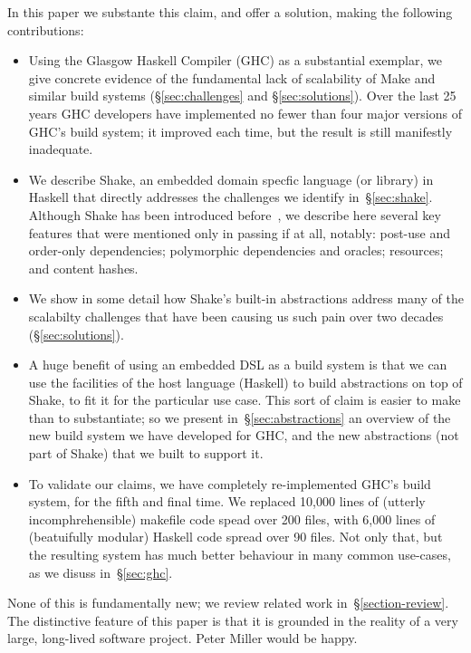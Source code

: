 In this paper we substante this claim, and offer a solution,
making the following contributions:
\begin{itemize}
\item Using the Glasgow Haskell Compiler (GHC) as a substantial exemplar,
we give concrete evidence of the fundamental lack of scalability of
Make and similar build systems (\S\ref{sec:challenges} and
\S\ref{sec:solutions}). Over the last 25 years GHC developers have implemented
no fewer than four major versions of GHC's build system; it improved each
time, but the result is still manifestly inadequate.

\item We describe Shake, an embedded domain specfic language (or library)
in Haskell that directly addresses the challenges we identify
in~\S\ref{sec:shake}.
Although Shake has been introduced before~\cite{shake}, we describe here
several key features that were mentioned only in passing if at all, notably:
post-use and order-only dependencies; polymorphic dependencies and oracles;
resources; and content hashes.

\item We show in some detail how Shake's built-in abstractions address
many of the scalabilty challenges that have been causing us such pain over
two decades (\S\ref{sec:solutions}).

\item A huge benefit of using an embedded DSL as a build system is that
we can use the facilities of the host language (Haskell) to build
abstractions on top of Shake, to fit it for the particular use case.
This sort of claim is easier to make than to substantiate; so we present
in~\S\ref{sec:abstractions} an overview of the new build system we have
developed for GHC, and the new abstractions (not part of Shake) that we built
to support it.

\item To validate our claims, we have completely re-implemented GHC's
build system, for the fifth and final time.  We replaced 10,000 lines
of (utterly incomphrehensible) makefile code spead over 200 files, with
6,000 lines of (beatuifully modular) Haskell code spread over 90 files.
Not only that, but the resulting system has much better behaviour in many
common use-cases, as we disuss in~\S\ref{sec:ghc}. 
\end{itemize}
None of this is fundamentally new; we review related work
in~\S\ref{section-review}.
The distinctive feature of this paper is that it is grounded in the reality
of a very large, long-lived software project.  Peter Miller would be happy.

